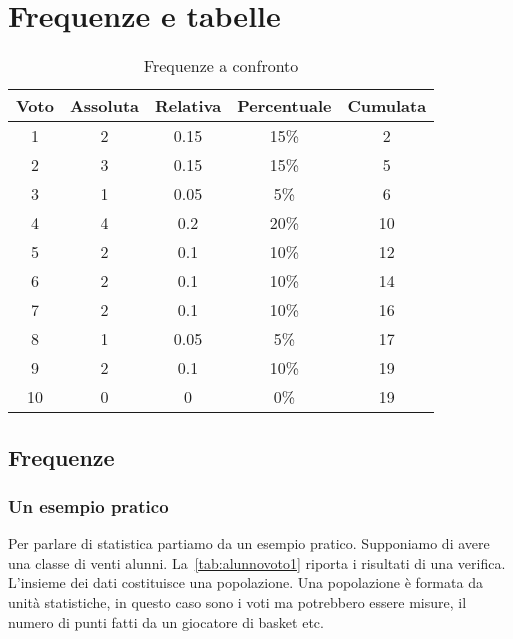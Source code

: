 \chapter{Frequenze e tabelle}
\label{cha:frequenzeTabelle}
\begin{table}%
	\centering
	\begin{tabular} {*{2} {S[table-format=1.0]}S[table-format=1.2]*{2} {S[table-format=2.0]} }%
		\toprule
		{Voto}  & {Assoluta} & {Relativa} & {Percentuale} &{Cumulata} \\
			& 2 & 0.15 & 15\% & 2  \\ 
		2	& 3 & 0.15 & 15\% & 5 \\ 
		3	& 1 & 0.05 & 5\% & 6 \\ 
		4	& 4 & 0.2 & 20\% & 10 \\ 
		5	& 2 & 0.1 & 10\% & 12 \\ 
		6 	& 2 & 0.1 & 10\% & 14 \\ 
		7	& 2 & 0.1 & 10\% & 16 \\ 
		8	& 1 & 0.05 & 5\% & 17 \\ 
		9	& 2 & 0.1 & 10\% & 19 \\ 
		10	& 0 & 0 & 0\% & 19 \\ 
		\bottomrule
	\end{tabular}
	\caption{Frequenze a confronto}
	\label{tab:FrequenzeConfronto}
\end{table}
\section{Frequenze}
\label{sec:Frequenze}
\subsection{Un esempio pratico}
\label{sec:Un esempioPratico}
Per parlare di statistica partiamo da un esempio pratico. Supponiamo di avere una classe di venti alunni. La~\vref{tab:alunnovoto1} riporta i risultati di una verifica. L'insieme dei dati costituisce una popolazione. Una popolazione è formata da unità statistiche, in questo caso sono i voti ma potrebbero essere misure, il numero di punti fatti da un giocatore di basket etc.   

